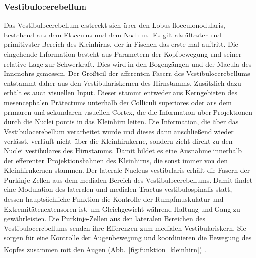 \subsubsection*{Vestibulocerebellum} 
Das Vestibulocerebellum erstreckt sich über den Lobus flocculonodularis, bestehend aus dem Flocculus und dem Nodulus. Es gilt als ältester und primitivster Bereich des Kleinhirns, der in Fischen das erste mal auftritt. Die eingehende Information besteht aus Parametern der Kopfbewegung und seiner relative Lage zur Schwerkraft. Dies wird in den Bogengängen und der Macula des Innenohrs gemessen. Der Großteil der afferenten Fasern des Vestibulocerebellums entstammt daher aus den Vestibulariskernen des Hirnstamms. Zusätzlich dazu erhält es auch visuellen Input. Dieser stammt entweder aus Kerngebieten des mesencephalen Prätectums unterhalb der Colliculi superiores oder aus dem primären und sekundären visuellen Cortex, die die Information über Projektionen durch die Nuclei pontis in das Kleinhirn leiten. Die Information, die über das Vestibulocerebellum verarbeitet wurde und dieses dann anschließend wieder verlässt, verläuft nicht über die Kleinhirnkerne, sondern zieht direkt zu den Nuclei vestibulares des Hirnstamms. Damit bildet es eine Ausnahme innerhalb der efferenten Projektionsbahnen des Kleinhirns, die sonst immer von den Kleinhirnkernen stammen. Der laterale Nucleus vestibularis erhält die Fasern der Purkinje-Zellen aus dem medialen Bereich des Vestibulocerebellums. Damit findet eine Modulation des lateralen und medialen Tractus vestibulospinalis statt, dessen hauptsächliche Funktion die Kontrolle der Rumpfmuskulatur und Extremitätenextensoren ist, um Gleichgewicht während Haltung und Gang zu gewährleisten.  Die Purkinje-Zellen aus den lateralen Bereichen des Vestibulocerebellums senden ihre Efferenzen zum medialen Vestibulariskern. Sie sorgen für eine Kontrolle der Augenbewegung und koordinieren die Bewegung des Kopfes zusammen mit den Augen (Abb.~\ref{fig:funktion_kleinhirn}) \textsuperscript{\cite[Kap.~42]{kandel2013principles}}.       

